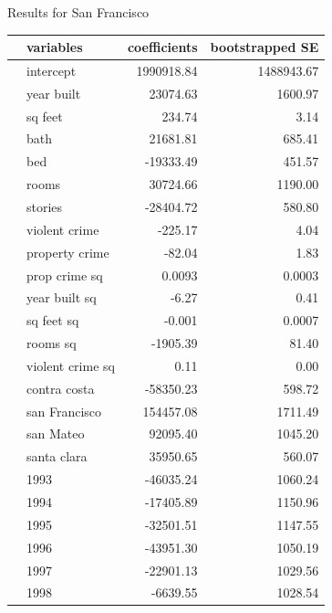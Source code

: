 \documentclass[12pt,a4paper]{article}
\begin{document}
Results for San Francisco
\begin{center}
\begin{tabular}{llrr}
\hline
\hline
&         variables &  coefficients &  bootstrapped SE \\
\hline
\hline
&         intercept &    1990918.84 &       1488943.67 \\
&        year built &      23074.63 &          1600.97 \\
&           sq feet &        234.74 &             3.14  \\
&              bath &       21681.81 &           685.41 \\
&               bed &    -19333.49 &           451.57  \\
&             rooms &       30724.66 &          1190.00 \\
&           stories &      -28404.72 &           580.80  \\
&     violent crime &       -225.17 &             4.04\\
&    property crime &          -82.04 &             1.83  \\
&     prop crime sq &          0.0093&             0.0003 \\
&     year built sq &        -6.27 &             0.41 \\
&        sq feet sq &         -0.001&             0.0007 \\
&          rooms sq &         -1905.39 &            81.40 \\
&  violent crime sq &       0.11 &             0.00  \\
&       contra costa     &    -58350.23 &           598.72 \\
&    san Francisco       &    154457.08 &          1711.49 \\
&     san Mateo           &     92095.40 &          1045.20\\
&      santa clara           &     35950.65 &           560.07 \\
& 1993             &    -46035.24 &          1060.24 \\
& 1994             &    -17405.89 &          1150.96 \\
& 1995             &    -32501.51 &          1147.55 \\
& 1996             &    -43951.30 &          1050.19 \\
& 1997             &    -22901.13 &          1029.56 \\
& 1998             &     -6639.55 &          1028.54 \\

\end{tabular}
\end{center}
\end{document}
